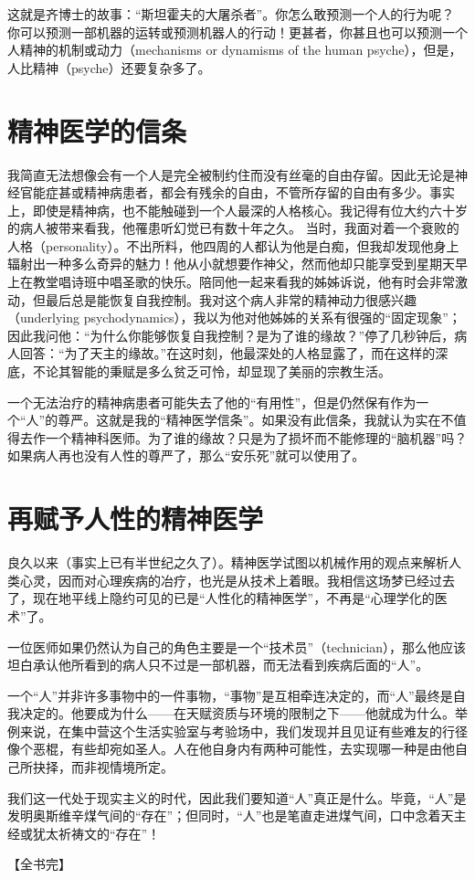 \documentclass[11pt,oneside]{book}
\begin{document}
\begin{common-format}
这就是齐博士的故事：“斯坦霍夫的大屠杀者”。你怎么敢预测一个人的行为呢？ 你可以预测一部机器的运转或预测机器人的行动！更甚者，你甚且也可以预测一个人精神的机制或动力（mechanisms or dynamisms of the human psyche），但是，人比精神（psyche）还要复杂多了。


\section{精神医学的信条}
我简直无法想像会有一个人是完全被制约住而没有丝毫的自由存留。因此无论是神经官能症甚或精神病患者，都会有残余的自由，不管所存留的自由有多少。事实上，即使是精神病，也不能触碰到一个人最深的人格核心。我记得有位大约六十岁的病人被带来看我，他罹患听幻觉已有数十年之久。 当时，我面对着一个衰败的人格（personality）。不出所料，他四周的人都认为他是白痴，但我却发现他身上辐射出一种多么奇异的魅力！他从小就想要作神父，然而他却只能享受到星期天早上在教堂唱诗班中唱圣歌的快乐。陪同他一起来看我的姊姊诉说，他有时会非常激动，但最后总是能恢复自我控制。我对这个病人非常的精神动力很感兴趣（underlying psychodynamics），我以为他对他姊姊的关系有很强的“固定现象”；因此我问他：“为什么你能够恢复自我控制？是为了谁的缘故？”停了几秒钟后，病人回答：“为了天主的缘故。”在这时刻，他最深处的人格显露了，而在这样的深底，不论其智能的秉赋是多么贫乏可怜，却显现了美丽的宗教生活。

一个无法治疗的精神病患者可能失去了他的“有用性”，但是仍然保有作为一个“人”的尊严。这就是我的“精神医学信条”。如果没有此信条，我就认为实在不值得去作一个精神科医师。为了谁的缘故？只是为了损坏而不能修理的“脑机器”吗？如果病人再也没有人性的尊严了，那么“安乐死”就可以使用了。


\section{再赋予人性的精神医学} 
良久以来（事实上已有半世纪之久了）。精神医学试图以机械作用的观点来解析人类心灵，因而对心理疾病的冶疗，也光是从技术上着眼。我相信这场梦已经过去了，现在地平线上隐约可见的已是“人性化的精神医学”，不再是“心理学化的医术”了。

一位医师如果仍然认为自己的角色主要是一个“技术员”（technician），那么他应该坦白承认他所看到的病人只不过是一部机器，而无法看到疾病后面的“人”。

一个“人”并非许多事物中的一件事物，“事物”是互相牵连决定的，而“人”最终是自我决定的。他要成为什么——在天赋资质与环境的限制之下——他就成为什么。举例来说，在集中营这个生活实验室与考验场中，我们发现并且见证有些难友的行径像个恶棍，有些却宛如圣人。人在他自身内有两种可能性，去实现哪一种是由他自己所抉择，而非视情境所定。

我们这一代处于现实主义的时代，因此我们要知道“人”真正是什么。毕竟，“人”是发明奥斯维辛煤气间的“存在”；但同时，“人”也是笔直走进煤气间，口中念着天主经或犹太祈祷文的“存在”！

【全书完】





\end{common-format}  
\end{document}
